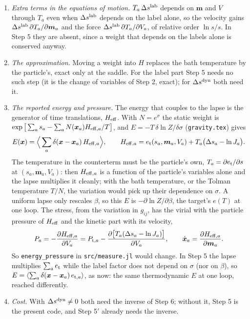 \documentclass[11pt,aps,preprint,nofootinbib,superscriptaddress,tightenlines]{revtex4-2}
\def\st{\begin{equation}}
\def\stp{\end{equation}}
\begin{document}
\begin{enumerate}
\item \emph{Extra terms in the equations of motion.}  $T_a\,\Delta s^{\rm lab}$ depends on $\bm m$ and $V$ through $T_a$ even when $\Delta s^{\rm lab}$ depends on the label alone, so the
  velocity gains $\Delta s^{\rm lab}\,\partial T_a/\partial\bm m_a$ and the force $\Delta s^{\rm lab}\,\partial T_a/\partial V_a$, of relative order $\ln s/s$.  In Step 5 they are absent, since a
  weight that depends on the labels alone is conserved anyway.
\item \emph{The approximation.}  Moving a weight into $H$ replaces the bath temperature by the particle's, exact only at the saddle.  For the label part Step 5 needs no such
  step (it is the change of variables of Step 2, exact); for $\Delta s^{\rm dyn}$ both need it.
\item \emph{The reported energy and pressure.}  The energy that couples to the lapse is the generator of time translations, $H_{\rm eff}$.  With $N=e^\sigma$ the static weight is
  $\exp\big[\sum_as_a-\sum_aN(\bm x_a)H_{{\rm eff},a}/T\big]$, and $E=-T\,\delta\ln Z/\delta\sigma$ (\nolinkurl{gravity.tex}) gives
  \st
  E(\bm x)=\Big\langle\sum_a\delta(\bm x-\bm x_a)\,H_{{\rm eff},a}\Big\rangle,\qquad H_{{\rm eff},a}=e_{\rm t}(s_a,\bm m_a,V_a)+T_a\big(\Delta s_a-\ln J_a\big) .
  \stp
  The temperature in the counterterm must be the particle's own, $T_a=\partial e_{\rm t}/\partial s$ at $(s_a,\bm m_a,V_a)$: then $H_{{\rm eff},a}$ is a function of the particle's variables
  alone and the lapse multiplies it cleanly; with the bath temperature, or the Tolman temperature $T/N$, the variation would pick up their dependence on $\sigma$.  A
  uniform lapse only rescales $\beta$, so this $E$ is $-\partial\ln Z/\partial\beta$, the target's $e(T)$ at one loop.  The stress, from the variation in $g_{ij}$, has the virial with
  the particle pressure of $H_{\rm eff}$ and the kinetic part with its velocity,
  \st
  P_a=-\frac{\partial H_{{\rm eff},a}}{\partial V_a}=P_{{\rm t},a}-\frac{\partial\big[T_a(\Delta s_a-\ln J_a)\big]}{\partial V_a},\qquad \dot{\bm x}_a=\frac{\partial H_{{\rm eff},a}}{\partial\bm m_a} .
  \stp
  So \texttt{energy\_pressure} in \nolinkurl{src/measure.jl} would change.  In Step 5 the lapse multiplies $\sum_ae_{\rm t}$ while the label factor does not depend on $\sigma$ (nor on
  $\beta$), so $E=\langle\sum_a\delta(\bm x-\bm x_a)\,e_{{\rm t},a}\rangle$, as now: the same thermodynamic $E$ at one loop, reached differently.
\item \emph{Cost.}  With $\Delta s^{\rm dyn}\neq0$ both need the inverse of Step 6; without it, Step 5 is the present code, and Step 5$'$ already needs the inverse.
\end{enumerate}
\end{document}
